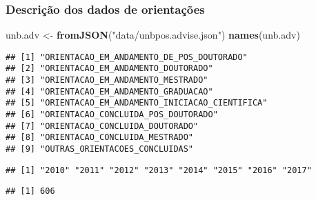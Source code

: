 \documentclass[]{article}
\newenvironment{Shaded}{\begin{snugshade}}{\end{snugshade}}
\newcommand{\KeywordTok}[1]{\textcolor[rgb]{0.13,0.29,0.53}{\textbf{#1}}}
\newcommand{\DataTypeTok}[1]{\textcolor[rgb]{0.13,0.29,0.53}{#1}}
\newcommand{\DecValTok}[1]{\textcolor[rgb]{0.00,0.00,0.81}{#1}}
\newcommand{\StringTok}[1]{\textcolor[rgb]{0.31,0.60,0.02}{#1}}
\newcommand{\OtherTok}[1]{\textcolor[rgb]{0.56,0.35,0.01}{#1}}
\newcommand{\OperatorTok}[1]{\textcolor[rgb]{0.81,0.36,0.00}{\textbf{#1}}}
\newcommand{\NormalTok}[1]{#1}
\begin{document}
\subsubsection{Descrição dos dados de
orientações}\label{descricao-dos-dados-de-orientacoes}

\begin{Shaded}
\begin{Highlighting}[]
\NormalTok{unb.adv <-}\StringTok{ }\KeywordTok{fromJSON}\NormalTok{(}\StringTok{"data/unbpos.advise.json"}\NormalTok{)}
\KeywordTok{names}\NormalTok{(unb.adv)}
\end{Highlighting}
\end{Shaded}

\begin{verbatim}
## [1] "ORIENTACAO_EM_ANDAMENTO_DE_POS_DOUTORADO"    
## [2] "ORIENTACAO_EM_ANDAMENTO_DOUTORADO"           
## [3] "ORIENTACAO_EM_ANDAMENTO_MESTRADO"            
## [4] "ORIENTACAO_EM_ANDAMENTO_GRADUACAO"           
## [5] "ORIENTACAO_EM_ANDAMENTO_INICIACAO_CIENTIFICA"
## [6] "ORIENTACAO_CONCLUIDA_POS_DOUTORADO"          
## [7] "ORIENTACAO_CONCLUIDA_DOUTORADO"              
## [8] "ORIENTACAO_CONCLUIDA_MESTRADO"               
## [9] "OUTRAS_ORIENTACOES_CONCLUIDAS"
\end{verbatim}

\begin{Shaded}
\end{Shaded}

\begin{verbatim}
## [1] "2010" "2011" "2012" "2013" "2014" "2015" "2016" "2017"
\end{verbatim}

\begin{Shaded}
\end{Shaded}

\begin{verbatim}
## [1] 606
\end{verbatim}

\begin{Shaded}
\end{Shaded}
\end{document}
